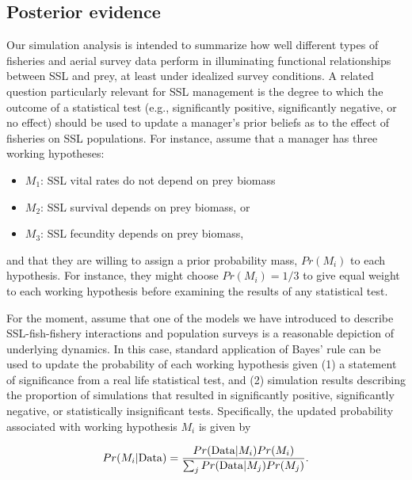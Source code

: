 \documentclass[nonumbib,leqno]{nrc1}
\begin{document}
\subsection{Posterior evidence}

Our simulation analysis is intended to summarize how well different types of fisheries and aerial survey data perform in illuminating functional relationships between SSL and prey, at least under idealized survey conditions.  A related question particularly relevant for SSL management is the degree to which the outcome of a statistical test (e.g., significantly positive, significantly negative, or no effect) should be used to update a manager's prior beliefs as to the effect of fisheries on SSL populations.  For instance, assume that a manager has three working hypotheses:
\begin{itemize}
\item $M_1$: SSL vital rates do not depend on prey biomass
\item $M_2$: SSL survival depends on prey biomass, or
\item $M_3$: SSL fecundity depends on prey biomass,
\end{itemize}
and that they are willing to assign a prior probability mass, $Pr(M_i)$ to each hypothesis.  For instance,
they might choose $Pr(M_i)=1/3$ to give equal weight to each working hypothesis before examining the results of any statistical test.

For the moment, assume that one of the models we have introduced to describe SSL-fish-fishery interactions and population surveys is a reasonable depiction of underlying dynamics.  In this case, standard application of Bayes' rule can be used to update the probability of each working hypothesis given (1) a statement of significance from a real life statistical test, and (2) simulation results describing the proportion of simulations that resulted in significantly positive, significantly negative, or statistically insignificant tests.  Specifically, the updated probability associated with working hypothesis $M_i$ is given by
\begin{linenomath}
  \begin{equation*}
     \label{eq:Bayes}
     Pr(M_i | {\rm Data}) = \frac{Pr({\rm Data}|M_i)Pr(M_i)}{\sum_j Pr({\rm Data}|M_j)Pr(M_j)}.
  \end{equation*}
\end{linenomath}
\end{document}
